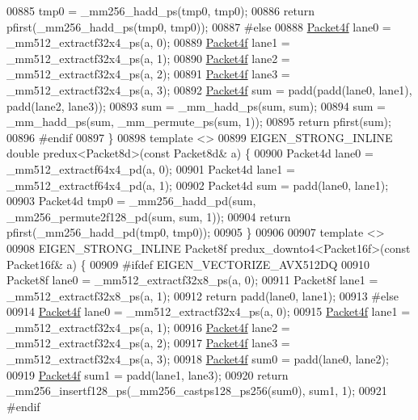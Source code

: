 \begin{DoxyCode}
00885   tmp0 = \_mm256\_hadd\_ps(tmp0, tmp0);
00886   \textcolor{keywordflow}{return} pfirst(\_mm256\_hadd\_ps(tmp0, tmp0));
00887 \textcolor{preprocessor}{#else}
00888   \hyperlink{struct_eigen_1_1internal_1_1_packet4f}{Packet4f} lane0 = \_mm512\_extractf32x4\_ps(a, 0);
00889   \hyperlink{struct_eigen_1_1internal_1_1_packet4f}{Packet4f} lane1 = \_mm512\_extractf32x4\_ps(a, 1);
00890   \hyperlink{struct_eigen_1_1internal_1_1_packet4f}{Packet4f} lane2 = \_mm512\_extractf32x4\_ps(a, 2);
00891   \hyperlink{struct_eigen_1_1internal_1_1_packet4f}{Packet4f} lane3 = \_mm512\_extractf32x4\_ps(a, 3);
00892   \hyperlink{struct_eigen_1_1internal_1_1_packet4f}{Packet4f} sum = padd(padd(lane0, lane1), padd(lane2, lane3));
00893   sum = \_mm\_hadd\_ps(sum, sum);
00894   sum = \_mm\_hadd\_ps(sum, \_mm\_permute\_ps(sum, 1));
00895   \textcolor{keywordflow}{return} pfirst(sum);
00896 \textcolor{preprocessor}{#endif}
00897 \}
00898 \textcolor{keyword}{template} <>
00899 EIGEN\_STRONG\_INLINE \textcolor{keywordtype}{double} predux<Packet8d>(\textcolor{keyword}{const} Packet8d& a) \{
00900   Packet4d lane0 = \_mm512\_extractf64x4\_pd(a, 0);
00901   Packet4d lane1 = \_mm512\_extractf64x4\_pd(a, 1);
00902   Packet4d sum = padd(lane0, lane1);
00903   Packet4d tmp0 = \_mm256\_hadd\_pd(sum, \_mm256\_permute2f128\_pd(sum, sum, 1));
00904   \textcolor{keywordflow}{return} pfirst(\_mm256\_hadd\_pd(tmp0, tmp0));
00905 \}
00906 
00907 \textcolor{keyword}{template} <>
00908 EIGEN\_STRONG\_INLINE Packet8f predux\_downto4<Packet16f>(\textcolor{keyword}{const} Packet16f& a) \{
00909 \textcolor{preprocessor}{#ifdef EIGEN\_VECTORIZE\_AVX512DQ}
00910   Packet8f lane0 = \_mm512\_extractf32x8\_ps(a, 0);
00911   Packet8f lane1 = \_mm512\_extractf32x8\_ps(a, 1);
00912   \textcolor{keywordflow}{return} padd(lane0, lane1);
00913 \textcolor{preprocessor}{#else}
00914   \hyperlink{struct_eigen_1_1internal_1_1_packet4f}{Packet4f} lane0 = \_mm512\_extractf32x4\_ps(a, 0);
00915   \hyperlink{struct_eigen_1_1internal_1_1_packet4f}{Packet4f} lane1 = \_mm512\_extractf32x4\_ps(a, 1);
00916   \hyperlink{struct_eigen_1_1internal_1_1_packet4f}{Packet4f} lane2 = \_mm512\_extractf32x4\_ps(a, 2);
00917   \hyperlink{struct_eigen_1_1internal_1_1_packet4f}{Packet4f} lane3 = \_mm512\_extractf32x4\_ps(a, 3);
00918   \hyperlink{struct_eigen_1_1internal_1_1_packet4f}{Packet4f} sum0 = padd(lane0, lane2);
00919   \hyperlink{struct_eigen_1_1internal_1_1_packet4f}{Packet4f} sum1 = padd(lane1, lane3);
00920   \textcolor{keywordflow}{return} \_mm256\_insertf128\_ps(\_mm256\_castps128\_ps256(sum0), sum1, 1);
00921 \textcolor{preprocessor}{#endif}

\end{DoxyCode}
